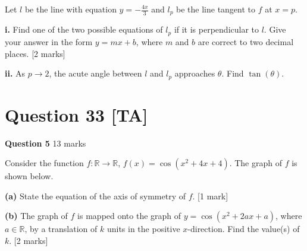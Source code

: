 \documentclass[10pt,a4paper]{article}
\begin{document}
Let $l$ be the line with equation $y = -\frac{4x}{3}$ and $l_p$ be the line tangent to $f$ at $x = p$.

\textbf{i.} Find one of the two possible equations of $l_p$ if it is perpendicular to $l$. Give your answer in the form $y = mx + b$, where $m$ and $b$ are correct to two decimal places. \hfill [2 marks]

\vspace{9\baselineskip}

\textbf{ii.} As $p \to 2$, the acute angle between $l$ and $l_p$ approaches $\theta$. Find $\tan(\theta)$.

\vspace{9\baselineskip}

\hrulefill

\section*{Question 33 [TA]}

\textbf{Question 5} \hfill 13 marks

Consider the function $f : \mathbb{R} \to \mathbb{R}$, $f(x) = \cos(x^2 + 4x + 4)$. The graph of $f$ is shown below.

\begin{center}
\end{center}

\textbf{(a)} State the equation of the axis of symmetry of $f$. \hfill [1 mark]

\vspace{9\baselineskip}

\textbf{(b)} The graph of $f$ is mapped onto the graph of $y = \cos(x^2 + 2ax + a)$, where $a \in \mathbb{R}$, by a translation of $k$ units in the positive $x$-direction. Find the value(s) of $k$. \hfill [2 marks]
\end{document}
